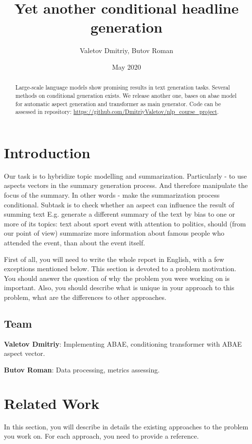 \documentclass{article}
\title{Yet another conditional headline generation}
\author{Valetov Dmitriy, Butov Roman}
\date{May 2020}
\begin{document}
\maketitle
\begin{abstract}
	Large-scale  language  models  show  promising  results in text  generation  tasks. Several methods on conditional generation exists.  We release another one, bases on abae model for automatic aspect generation and transformer as main generator.
	Code can be assessed in repository: \url{https://github.com/DmitriyValetov/nlp_course_project}.
\end{abstract}



\section{Introduction}
Our task is to hybridize topic modelling and summarization. Particularly - to use aspects vectors in the summary generation process. And therefore manipulate the focus of the summary. In other words - make the summarization process conditional.
Subtask is to check whether an aspect can influence the result of summing text  E.g. generate a different summary of the text by bias to one or more of its topics: text about sport event with attention to politics, should (from our point of view) summarize more information about famous people who attended the event, than about the event itself.


First of all, you will need to write the whole report in English, with a few exceptions mentioned below.
This section is devoted to a problem motivation. You should answer the question of why the problem you were working on is important. Also, you should describe what is unique in your approach to this problem, what are the differences to other approaches.

\subsection{Team}

\textbf{Valetov Dmitriy}: Implementing ABAE, conditioning transformer with ABAE aspect vector.

\textbf{Butov Roman}: Data processing, metrics assessing.


\section{Related Work}
\label{sec:related}
In this section, you will describe in details the existing approaches to the problem you work on. For each approach, you need to provide a reference. 
\end{document}
